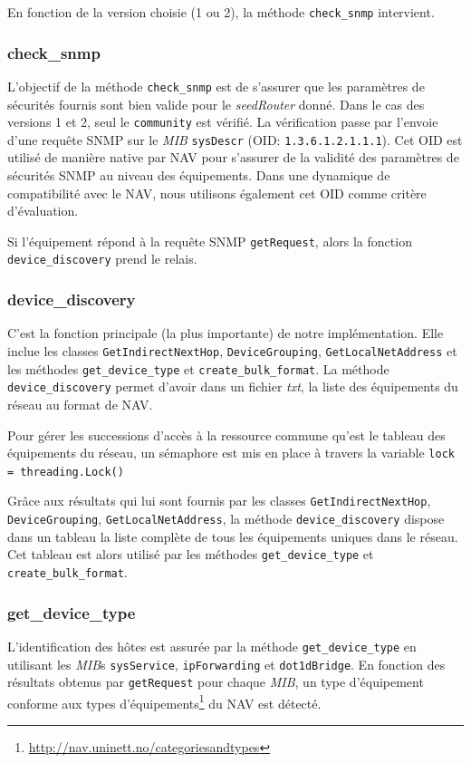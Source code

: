En fonction de la version choisie (1 ou 2), la méthode \texttt{check\_snmp} intervient.

\subsubsection{check\_snmp}
L'objectif de la méthode \texttt{check\_snmp} est de s'assurer que les paramètres de sécurités fournis sont bien valide pour le \emph{seedRouter} donné. Dans le cas des versions 1 et 2, seul le \texttt{community} est vérifié. La vérification passe par l'envoie d'une requête SNMP sur le \emph{MIB} \texttt{sysDescr} (OID: \texttt{1.3.6.1.2.1.1.1}). Cet OID est utilisé de manière native par NAV pour s'assurer de la validité des paramètres de sécurités SNMP au niveau des équipements. Dans une dynamique de compatibilité avec le NAV, nous utilisons également cet OID comme critère d'évaluation.

Si l'équipement répond à la requête SNMP \texttt{getRequest}, alors la fonction  \texttt{device\_discovery} prend le relais.

\subsubsection{device\_discovery}
C'est la fonction principale (la plus importante) de notre implémentation. Elle inclue les classes \texttt{GetIndirectNextHop}, \texttt{DeviceGrouping}, \texttt{GetLocalNetAddress} et les méthodes \texttt{get\_device\_type} et \texttt{create\_bulk\_format}. La méthode \texttt{device\_discovery} permet d'avoir dans un fichier \emph{txt}, la liste des équipements du réseau au format de NAV.

Pour gérer les successions d'accès à la ressource commune qu'est le tableau des équipements du réseau, un sémaphore est mis en place à travers la variable \texttt{lock = threading.Lock()}

Grâce aux résultats qui lui sont fournis par les classes \texttt{GetIndirectNextHop}, \texttt{DeviceGrouping}, \texttt{GetLocalNetAddress}, la méthode \texttt{device\_discovery} dispose dans un tableau la liste complète de tous les équipements uniques dans le réseau. Cet tableau est alors utilisé par les méthodes \texttt{get\_device\_type} et \texttt{create\_bulk\_format}.

\subsubsection{get\_device\_type\\}
L'identification des hôtes est assurée par la méthode \texttt{get\_device\_type} en utilisant les \emph{MIB}s \texttt{sysService}, \texttt{ipForwarding} et \texttt{dot1dBridge}. En fonction des résultats obtenus par \texttt{getRequest} pour chaque \emph{MIB}, un type d'équipement conforme aux types d'équipements\footnote{\url{http://nav.uninett.no/categoriesandtypes}} du NAV est détecté.
